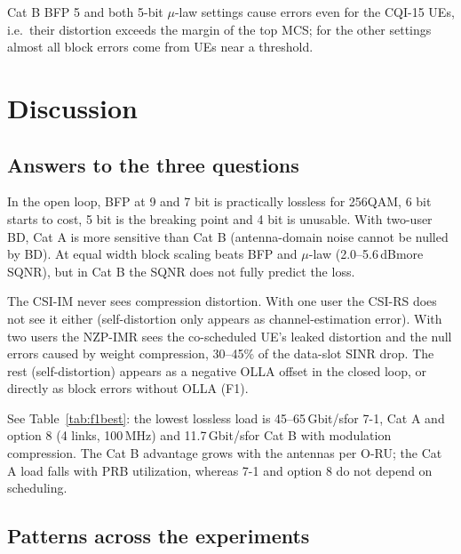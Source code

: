 \documentclass[11pt,a4paper]{article}
\newcommand{\dB}{\,dB}
\newcommand{\Gbps}{\,Gbit/s}
\begin{document}
Cat B BFP 5 and both 5-bit $\mu$-law settings cause errors even for the CQI-15 UEs, i.e.\ their distortion exceeds the margin of
the top MCS; for the other settings almost all block errors come from UEs near a threshold.

\section{Discussion}

\subsection{Answers to the three questions}

\begin{description}[leftmargin=1.2em, style=nextline]
  \item[Q1] In the open loop, BFP at 9 and 7 bit is practically lossless for 256QAM, 6 bit starts to cost, 5 bit is the breaking
        point and 4 bit is unusable. With two-user BD, Cat A is more sensitive than Cat B (antenna-domain noise cannot be nulled
        by BD). At equal width block scaling beats BFP and $\mu$-law (2.0--5.6\dB more SQNR), but in Cat B the SQNR does not
        fully predict the loss.
  \item[Q2] The CSI-IM never sees compression distortion. With one user the CSI-RS does not see it either (self-distortion only
        appears as channel-estimation error). With two users the NZP-IMR sees the co-scheduled UE's leaked distortion and the null
        errors caused by weight compression, 30--45\% of the data-slot SINR drop. The rest (self-distortion) appears as a
        negative OLLA offset in the closed loop, or directly as block errors without OLLA (F1).
  \item[Q3] See Table~\ref{tab:f1best}: the lowest lossless load is 45--65\Gbps for 7-1, Cat A and option 8 (4 links, 100\,MHz) and
        11.7\Gbps for Cat B with modulation compression. The Cat B advantage grows with the antennas per O-RU; the Cat A load
        falls with PRB utilization, whereas 7-1 and option 8 do not depend on scheduling.
\end{description}

\subsection{Patterns across the experiments}
\end{document}
